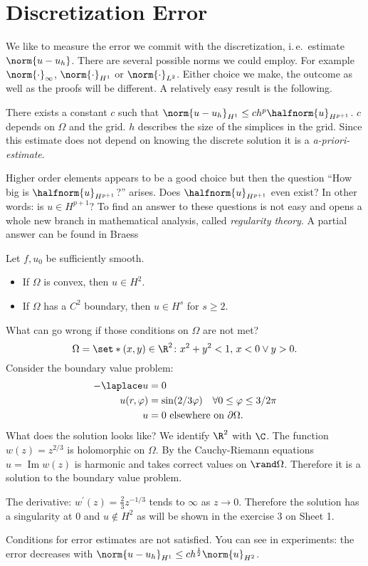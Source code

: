 \section{Discretization Error}
We like to measure the error we commit with the discretization, i.\,e.\ estimate $\norm{u-u_h}$. There are several possible norms we could employ. For example $\norm{\cdot}_\infty$, $\norm{\cdot}_{H^1}$ or $\norm{\cdot}_{L^2}$. Either choice we make, the outcome as well as the proofs will be different. A relatively easy result is the following.
\begin{theorem}
  There exists a constant $c$ such that $\norm{u-u_h}_{H^1}\leq ch^p\halfnorm{u}_{H^{p+1}}$. $c$ depends on $\Omega$ and the grid. $h$ describes the size of the simplices in the grid. Since this estimate does not depend on knowing the discrete solution it is a \textit{a-priori-estimate}.
\end{theorem}
Higher order elements appears to be a good choice but then
the question \enquote{How big is $\halfnorm{u}_{H^{p+1}}$?} arises. Does $\halfnorm{u}_{H^{p+1}}$ even exist? In other words: is $u\in H^{p+1}$? To find an answer to these questions is not easy and opens a whole new branch in mathematical analysis, called \textit{regularity theory}. A partial answer can be found in Braess %
\begin{theorem}%
Let $f,u_0$ be sufficiently smooth.
\begin{itemize}
  \item If $\Omega$ is convex, then $u\in H^2$.
  \item If $\Omega$ has a $C^2$ boundary, then $u\in H^s$ for $s\geq 2$.
\end{itemize}
\end{theorem}
\begin{example}
What can go wrong if those conditions on $\Omega$ are not met?
\begin{equation*}
  \Omega=\set*{(x,y)\in\R^2\colon x^2+y^2<1,\,x<0\lor y>0}.
\end{equation*}
Consider the boundary value problem:
\begin{align*}
	-\laplace u&=0\\
	u(r,\varphi)&=\sin(2/3\varphi)\quad \forall 0\leq\varphi\leq3/2\pi \\
	u&=0 \text{ elsewhere on } \partial\Omega.
\end{align*}
What does the solution looks like? We identify $\R^2$ with $\C$. The function $w(z)=z^{2/3}$ is holomorphic on $\Omega$. By the Cauchy-Riemann equations $u = \operatorname{Im}w(z)$ is harmonic and takes correct values on $\rand\Omega$. Therefore it is a solution to the boundary value problem.

The derivative: $w^\prime(z)=\frac23z^{-1/3}$ tends to $\infty$ as $z\to 0$. Therefore the solution has a singularity at $0$ and $u\notin H^2$ as will be shown in the exercise 3 on Sheet 1.
\end{example}

Conditions for error estimates are not satisfied. You can see in experiments: the error decreases with $\norm{u - u_h}_{H^1} \leq c h^{\frac{1}{2}}\norm{u}_{H^2}$.

